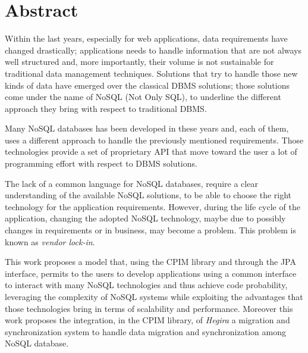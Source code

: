 \thispagestyle{empty}

\chapter*{Abstract}
Within the last years, especially for web applications, data requirements have changed drastically; applications needs to handle information that are not always well structured and, more importantly, their volume is not sustainable for traditional data management techniques. Solutions that try to handle those new kinds of data have emerged over the classical DBMS solutions; those solutions come under the name of NoSQL (Not Only SQL), to underline the different approach they bring with respect to traditional  DBMS.

\noindent Many NoSQL databases has been developed in these years and, each of them, uses a different approach to handle the previously mentioned requirements. Those technologies provide a set of proprietary API that move toward the user a lot of programming effort with respect to DBMS solutions. 

\noindent The lack of a common language for NoSQL databases, require a clear understanding of the available NoSQL solutions, to be able to choose the right technology for the application requirements. However, during the life cycle of the application, changing the adopted NoSQL technology, maybe due to possibly changes in requirements or in business, may become a problem. This problem is known as \textit{vendor lock-in}.    

\noindent This work proposes a model that, using the CPIM library and through the JPA interface, permits to the users to develop applications using a common interface to interact with many NoSQL technologies and thus achieve code probability, leveraging the complexity of NoSQL systems while exploiting the advantages that those technologies bring in terms of scalability and performance. Moreover this work proposes the integration, in the CPIM library, of \textit{Hegira} a migration and synchronization system to handle data migration and synchronization among NoSQL database.

\cleardoublepage

\thispagestyle{empty}

